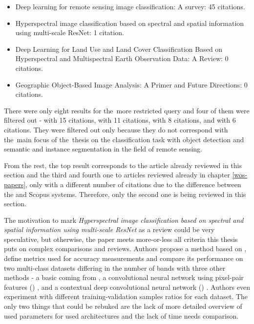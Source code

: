 \begin{itemize}
	\item Deep learning for remote sensing image classification: A survey: 45 citations. \cite{review-dl-rs}
	\item Hyperspectral image classification based on spectral and spatial information using multi-scale ResNet: 1 citation. \cite{hs-multi-scale-resnet}
	\item Deep Learning for Land Use and Land Cover Classification Based on Hyperspectral and Multispectral Earth Observation Data: A Review: 0 citations. \cite{review-dl-lulc}
	\item Geographic Object-Based Image Analysis: A Primer and Future Directions: 0 citations. \cite{geobia}
\end{itemize}

There were only eight results for the~more restricted query and four of them were filtered out - \cite{review-st-fusion} with 15 citations, \cite{ml-cv-phenotyping} with 11 citations, \cite{survey-dl-rs-enhancement} with 8 citations, and \cite{survey-dl-super-resolution} with 6 citations. They were filtered out only because they do not correspond with the~main focus of the~thesis on the classification task with object detection and semantic and instance segmentation in the field of remote sensing.

From the rest, the top result corresponds to the article already reviewed in this section and the third and fourth one to articles reviewed already in chapter \ref{wos-papers}, only with a different number of citations due to the difference between the  and Scopus systems. Therefore, only the second one is being reviewed in this section.

The motivation to mark \textit{Hyperspectral image classification based on spectral and spatial information using multi-scale ResNet} as a review could be very speculative, but otherwise, the paper meets more-or-less all criteria this thesis puts on complex comparisons and reviews. Authors propose a method based on , define metrics used for accuracy measurements and compare its performance on two multi-class datasets differing in the number of bands with three other methods - a basic  coming from \cite{cnn-hs}, a convolutional neural network using pixel-pair features () \cite{cnn-ppf}, and a contextual deep convolutional neural network () \cite{cd-cnn}. Authors even experiment with different training-validation samples ratios for each dataset. The only two things that could be rebuked are the lack of more detailed overview of used parameters for used architectures and the lack of time needs comparison.

